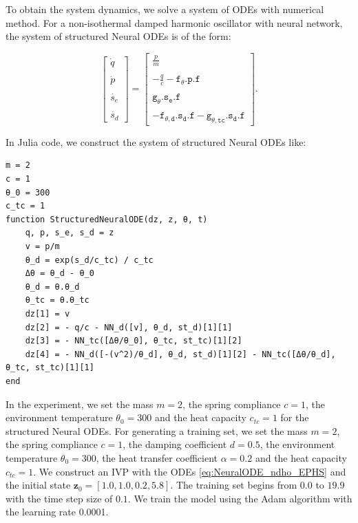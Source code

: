 \documentclass[
	parskip, 			   %
	twoside, 			   %
	DIV=14, 			   %
	BCOR=15.0mm, 		   %
	headsepline, 		   %
	open=right, 		   %
	captions=tableheading, %
	bibliography=totoc,    %
	numbers=noenddot       %
]{scrreprt}
\begin{document}
To obtain the system dynamics, we solve a system of ODEs with numerical method. For a non-isothermal damped harmonic oscillator with neural network, the system of structured Neural ODEs is of the form:

\begin{equation}
    \label{eq:NeuralODE_ndho_EPHS}
    \begin{bmatrix}
    \dot{q}\\\\
    \dot{p}\\\\
    \dot{s_e}\\\\
    \dot{s_d}
    \end{bmatrix}
    =
    \begin{bmatrix}
    \frac{p}{m}\\\\
    -\frac{q}{c}-\mathtt{f_{\theta}.p.f}\\\\
    \mathtt{g_{\theta}.s_{e}.f}\\\\
    -\mathtt{f_{\theta, d}.s_{d}.f}-\mathtt{g_{\theta, tc}.s_{d}.f}
    \end{bmatrix}.
\end{equation}

In Julia code, we construct the system of structured Neural ODEs like:

\begin{verbatim}
m = 2
c = 1
θ_0 = 300
c_tc = 1
function StructuredNeuralODE(dz, z, θ, t)
    q, p, s_e, s_d = z
    v = p/m
    θ_d = exp(s_d/c_tc) / c_tc
    Δθ = θ_d - θ_0
    θ_d = θ.θ_d
    θ_tc = θ.θ_tc   
    dz[1] = v
    dz[2] = - q/c - NN_d([v], θ_d, st_d)[1][1]
    dz[3] = - NN_tc([Δθ/θ_0], θ_tc, st_tc)[1][2]
    dz[4] = - NN_d([-(v^2)/θ_d], θ_d, st_d)[1][2] - NN_tc([Δθ/θ_d], θ_tc, st_tc)[1][1]
end
\end{verbatim}

In the experiment, we set the mass $m=2$, the spring compliance $c=1$, the environment temperature $\theta_{0}=300$ and the heat capacity $c_{tc}=1$ for the structured Neural ODEs. For generating a training set, we set the mass $m=2$, the spring compliance $c=1$, the damping coefficient $d=0.5$, the environment temperature $\theta_{0}=300$, the heat transfer coefficient $\alpha=0.2$ and the heat capacity $c_{tc}=1$. We construct an IVP with the ODEs \ref{eq:NeuralODE_ndho_EPHS} and the initial state $\mathbf{z}_{0} = [1.0, 1.0, 0.2, 5.8]$. The training set begins from $0.0$ to $19.9$ with the time step size of $0.1$. We train the model using the Adam algorithm with the learning rate 0.0001.
\end{document}
